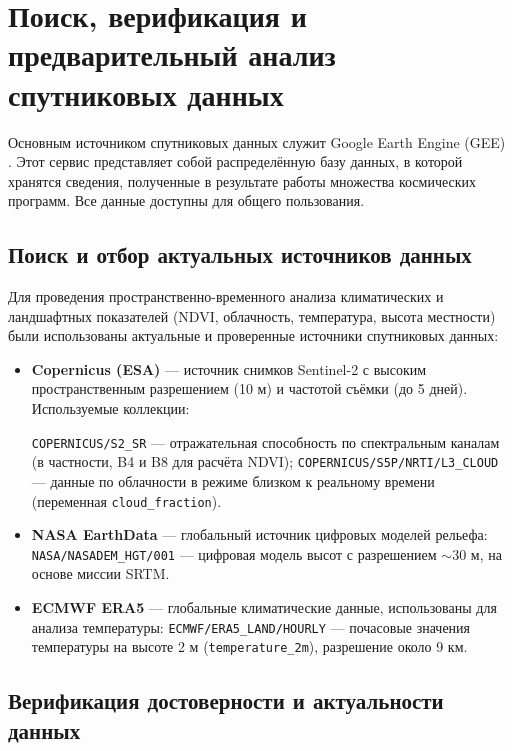 \chapter{Поиск, верификация и предварительный анализ спутниковых данных}
Основным источником спутниковых данных служит Google Earth Engine (GEE) \cite{Cardille2024}. Этот сервис представляет собой распределённую базу данных, в которой хранятся сведения, полученные в результате работы множества космических программ. Все данные доступны для общего пользования.
\section{Поиск и отбор актуальных источников данных}

Для проведения пространственно-временного анализа климатических и ландшафтных показателей (NDVI, облачность, температура, высота местности) были использованы актуальные и проверенные источники спутниковых данных:

\begin{itemize}
	\item \textbf{Copernicus (ESA)} \cite{Copernicus2023} — источник снимков Sentinel-2 с высоким пространственным разрешением (10 м) и частотой съёмки (до 5 дней). Используемые коллекции:

		 \texttt{COPERNICUS/S2\_SR} — отражательная способность по спектральным каналам (в частности, B4 и B8 для расчёта NDVI);
		 \texttt{COPERNICUS/S5P/NRTI/L3\_CLOUD} — данные по облачности в режиме близком к реальному времени (переменная \texttt{cloud\_fraction}).

	\item \textbf{NASA EarthData} \cite{NASA_Earthdata2023} — глобальный источник цифровых моделей рельефа:  \texttt{NASA/NASADEM\_HGT/001} — цифровая модель высот с разрешением $\sim$30 м, на основе миссии SRTM.

	
	\item \textbf{ECMWF ERA5} \cite{ECMWF_Reanalysis_V5} — глобальные климатические данные, использованы для анализа температуры:
	 \texttt{ECMWF/ERA5\_LAND/HOURLY} — почасовые значения температуры на высоте 2 м (\texttt{temperature\_2m}), разрешение около 9 км.

\end{itemize}

\section{Верификация достоверности и актуальности данных}

